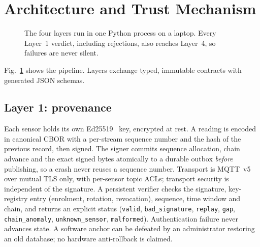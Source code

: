 \documentclass[conference]{IEEEtran}
\newcommand{\code}[1]{\texttt{\small #1}}
\begin{document}
\section{Architecture and Trust Mechanism}

\begin{figure}[t]
\centering
{}
\caption{The four layers run in one Python process on a laptop. Every Layer~1 verdict, including rejections,
also reaches Layer~4, so failures are never silent.}
\label{fig:arch}
\end{figure}

Fig.~\ref{fig:arch} shows the pipeline. Layers exchange typed, immutable contracts with generated JSON
schemas.

\subsection{Layer 1: provenance}
Each sensor holds its own Ed25519~\cite{ed25519} key, encrypted at rest. A reading is encoded in canonical CBOR with a
per-stream sequence number and the hash of the previous record, then signed. The signer commits sequence
allocation, chain advance and the exact signed bytes atomically to a durable outbox \emph{before}
publishing, so a crash never reuses a sequence number. Transport is MQTT~v5 over mutual TLS only, with
per-sensor topic ACLs; transport security is independent of the signature. A persistent verifier checks the
signature, key-registry entry (enrolment, rotation, revocation), sequence, time window and chain, and
returns an explicit status (\code{valid}, \code{bad\_signature}, \code{replay}, \code{gap},
\code{chain\_anomaly}, \code{unknown\_sensor}, \code{malformed}). Authentication failure never advances
state. A software anchor can be defeated by an administrator restoring an old database; no hardware
anti-rollback is claimed.
\end{document}
